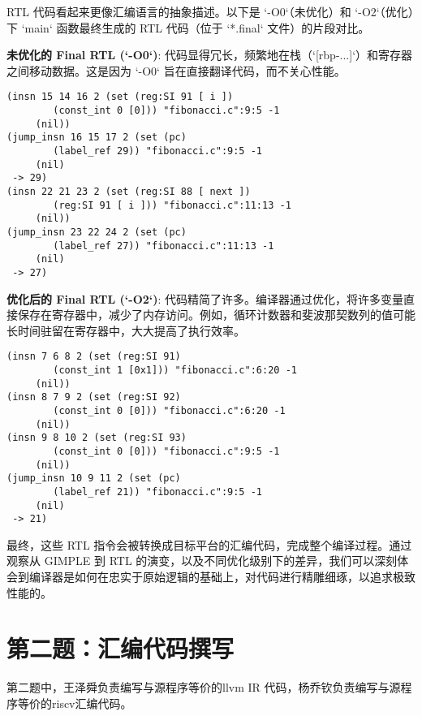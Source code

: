 \documentclass[a4paper]{article}
\begin{document}
RTL 代码看起来更像汇编语言的抽象描述。以下是 `-O0`（未优化）和 `-O2`（优化）下 `main` 函数最终生成的 RTL 代码（位于 `*.final` 文件）的片段对比。

\textbf{未优化的 Final RTL (`-O0`)}:
代码显得冗长，频繁地在栈（`[rbp-...]`）和寄存器之间移动数据。这是因为 `-O0` 旨在直接翻译代码，而不关心性能。
\begin{lstlisting}[language=text, caption={fibonacci.c.273r.final (未优化片段)}]
(insn 15 14 16 2 (set (reg:SI 91 [ i ])
        (const_int 0 [0])) "fibonacci.c":9:5 -1
     (nil))
(jump_insn 16 15 17 2 (set (pc)
        (label_ref 29)) "fibonacci.c":9:5 -1
     (nil)
 -> 29)
(insn 22 21 23 2 (set (reg:SI 88 [ next ])
        (reg:SI 91 [ i ])) "fibonacci.c":11:13 -1
     (nil))
(jump_insn 23 22 24 2 (set (pc)
        (label_ref 27)) "fibonacci.c":11:13 -1
     (nil)
 -> 27)
\end{lstlisting}

\textbf{优化后的 Final RTL (`-O2`)}:
代码精简了许多。编译器通过优化，将许多变量直接保存在寄存器中，减少了内存访问。例如，循环计数器和斐波那契数列的值可能长时间驻留在寄存器中，大大提高了执行效率。
\begin{lstlisting}[language=text, caption={fibonacci.c.340r.final (优化片段)}]
(insn 7 6 8 2 (set (reg:SI 91)
        (const_int 1 [0x1])) "fibonacci.c":6:20 -1
     (nil))
(insn 8 7 9 2 (set (reg:SI 92)
        (const_int 0 [0])) "fibonacci.c":6:20 -1
     (nil))
(insn 9 8 10 2 (set (reg:SI 93)
        (const_int 0 [0])) "fibonacci.c":9:5 -1
     (nil))
(jump_insn 10 9 11 2 (set (pc)
        (label_ref 21)) "fibonacci.c":9:5 -1
     (nil)
 -> 21)
\end{lstlisting}

最终，这些 RTL 指令会被转换成目标平台的汇编代码，完成整个编译过程。通过观察从 GIMPLE 到 RTL 的演变，以及不同优化级别下的差异，我们可以深刻体会到编译器是如何在忠实于原始逻辑的基础上，对代码进行精雕细琢，以追求极致性能的。
\section{第二题：汇编代码撰写}

第二题中，王泽舜负责编写与源程序等价的llvm IR 代码，杨乔钦负责编写与源程序等价的riscv汇编代码。
\end{document}
